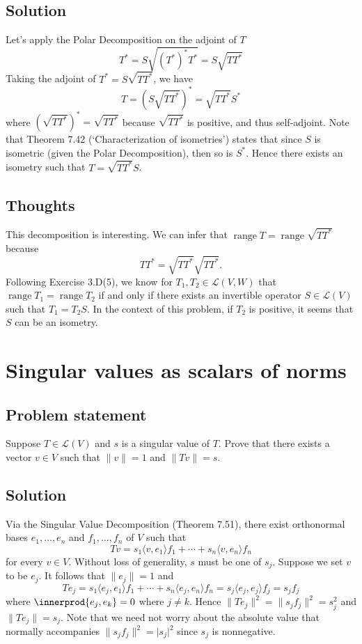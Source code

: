 \documentclass{article}
\providecommand{\abs}[1]{\lvert#1\rvert} \providecommand{\norm}[1]{\lVert#1\rVert}
\DeclarePairedDelimiter{\innerprod}\langle\rangle
\begin{document}
\subsection*{Solution}
Let's apply the Polar Decomposition on the adjoint of $T$
\[T^*=S\sqrt{(T^*)^*T^*}=S\sqrt{TT^*}\]
Taking the adjoint of $T^*=S\sqrt{TT^*}$, we have
\[T=(S\sqrt{TT^*})^*=\sqrt{TT^*}S^*\]
where $(\sqrt{TT^*})^*=\sqrt{TT^*}$ because $\sqrt{TT^*}$ is positive, and thus self-adjoint. Note that Theorem 7.42 (`Characterization of isometries') states that since $S$ is isometric (given the Polar Decomposition), then so is $S^*$. Hence there exists an isometry such that $T=\sqrt{TT^*}S$.

\subsection*{Thoughts}
This decomposition is interesting. We can infer that $\operatorname{range}T=\operatorname{range}\sqrt{TT^*}$ because
\[TT^*=\sqrt{TT^*}\sqrt{TT^*}.\]
Following Exercise 3.D(5), we know for $T_1,T_2\in\mathcal{L}(V,W)$ that $\operatorname{range}T_1=\operatorname{range}T_2$ if and only if there exists an invertible operator $S\in\mathcal{L}(V)$ such that $T_1=T_2S$. In the context of this problem, if $T_2$ is positive, it seems that $S$ can be an isometry.

\clearpage

\section{Singular values as scalars of norms}
\subsection*{Problem statement}
Suppose $T\in\mathcal{L}(V)$ and $s$ is a singular value of $T$. Prove that there exists a vector $v\in V$ such that $\norm{v}=1$ and $\norm{Tv}=s$.

\subsection*{Solution}
Via the Singular Value Decomposition (Theorem 7.51), there exist orthonormal bases $e_1,\ldots,e_n$ and $f_1,\ldots,f_n$ of $V$ such that
\[Tv=s_1\langle v,e_1\rangle f_1+\cdots +s_n\langle v,e_n\rangle f_n\]
for every $v\in V$. Without loss of generality, $s$ must be one of $s_j$. Suppose we set $v$ to be $e_j$. It follows that $\norm{e_j}=1$ and 
\[Te_j=s_1\langle e_j,e_1\rangle f_1+\cdots +s_n\langle e_j,e_n\rangle f_n=s_j\langle e_j,e_j\rangle f_j=s_jf_j\]
where $\innerprod{e_j,e_k}=0$ where $j\neq k$. Hence $\norm{Te_j}^2=\norm{s_jf_j}^2=s_j^2$ and $\norm{Te_j}=s_j$. Note that we need not worry about the absolute value that normally accompanies $\norm{s_jf_j}^2=\abs{s_j}^2$ since $s_j$ is nonnegative.
\end{document}
